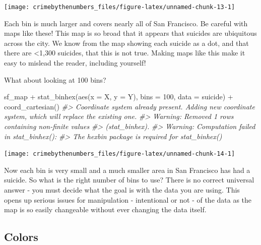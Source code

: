 \documentclass[
]{krantz}
\makeatletter
\newenvironment{Shaded}{\begin{snugshade}}{\end{snugshade}}
\newcommand{\AttributeTok}[1]{\textcolor[rgb]{0.61,0.61,0.61}{#1}}
\newcommand{\CommentTok}[1]{\textcolor[rgb]{0.37,0.37,0.37}{\textit{#1}}}
\newcommand{\DecValTok}[1]{\textcolor[rgb]{0.06,0.06,0.06}{#1}}
\newcommand{\FunctionTok}[1]{\textcolor[rgb]{0,0,0}{#1}}
\newcommand{\NormalTok}[1]{#1}
\newcommand{\SpecialCharTok}[1]{\textcolor[rgb]{0,0,0}{#1}}
\newenvironment{kframe}{%
\medskip{}
\setlength{\fboxsep}{.8em}
 \def\at@end@of@kframe{}%
 \ifinner\ifhmode%
  \def\at@end@of@kframe{\end{minipage}}%
  \begin{minipage}{\columnwidth}%
 \fi\fi%
 \def\FrameCommand##1{\hskip\@totalleftmargin \hskip-\fboxsep
 \colorbox{shadecolor}{##1}\hskip-\fboxsep
     \hskip-\linewidth \hskip-\@totalleftmargin \hskip\columnwidth}%
 \MakeFramed {\advance\hsize-\width
   \@totalleftmargin\z@ \linewidth\hsize
   \@setminipage}}%
 {\par\unskip\endMakeFramed%
 \at@end@of@kframe}
\renewenvironment{Shaded}{\begin{kframe}}{\end{kframe}}
\makeatother
\begin{document}
\begin{center}\texttt{[image: crimebythenumbers\_files/figure-latex/unnamed-chunk-13-1]} \end{center}

Each bin is much larger and covers nearly all of San Francisco. Be careful with maps like these! This map is so broad that it appears that suicides are ubiquitous across the city. We know from the map showing each suicide as a dot, and that there are \textless1,300 suicides, that this is not true. Making maps like this make it easy to mislead the reader, including yourself!

What about looking at 100 bins?

\begin{Shaded}
\begin{Highlighting}[]
\NormalTok{sf\_map }\SpecialCharTok{+}
  \FunctionTok{stat\_binhex}\NormalTok{(}\FunctionTok{aes}\NormalTok{(}\AttributeTok{x =}\NormalTok{ X, }\AttributeTok{y =}\NormalTok{ Y),}
              \AttributeTok{bins =} \DecValTok{100}\NormalTok{,}
              \AttributeTok{data =}\NormalTok{ suicide) }\SpecialCharTok{+}
  \FunctionTok{coord\_cartesian}\NormalTok{() }
\CommentTok{\#\textgreater{} Coordinate system already present. Adding new coordinate system, which will replace the existing one.}
\CommentTok{\#\textgreater{} Warning: Removed 1 rows containing non{-}finite values}
\CommentTok{\#\textgreater{} (stat\_binhex).}
\CommentTok{\#\textgreater{} Warning: Computation failed in \textasciigrave{}stat\_binhex()\textasciigrave{}:}
\CommentTok{\#\textgreater{} The \textasciigrave{}hexbin\textasciigrave{} package is required for \textasciigrave{}stat\_binhex()\textasciigrave{}}
\end{Highlighting}
\end{Shaded}

\begin{center}\texttt{[image: crimebythenumbers\_files/figure-latex/unnamed-chunk-14-1]} \end{center}

Now each bin is very small and a much smaller area in San Francisco has had a suicide. So what is the right number of bins to use? There is no correct universal answer - you must decide what the goal is with the data you are using. This opens up serious issues for manipulation - intentional or not - of the data as the map is so easily changeable without ever changing the data itself.

\hypertarget{colors}{%
\subsection{Colors}\label{colors}}
\end{document}
